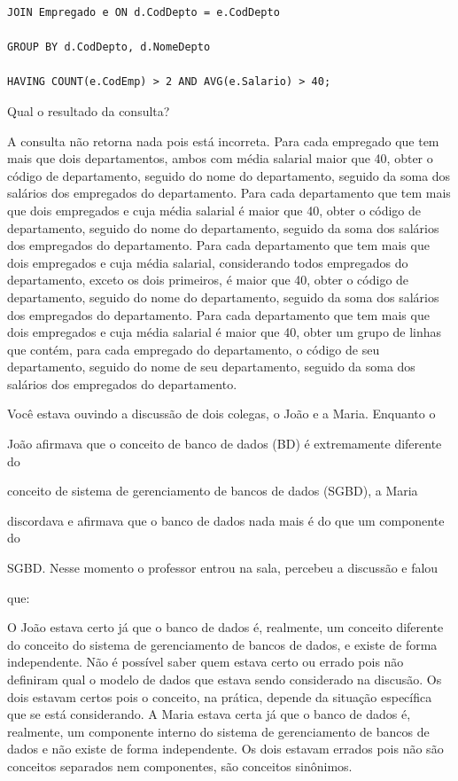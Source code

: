 \documentclass[12pt, addpoints]{exam}
\begin{document}
\begin{questions}
\begin{verbatim}
JOIN Empregado e ON d.CodDepto = e.CodDepto

GROUP BY d.CodDepto, d.NomeDepto

HAVING COUNT(e.CodEmp) > 2 AND AVG(e.Salario) > 40;

\end{verbatim}



Qual o resultado da consulta?
\begin{choices}
\choice A consulta não retorna nada pois está incorreta.
\choice Para cada empregado que tem mais que dois departamentos, ambos com média salarial maior que 40, obter o código de departamento, seguido do nome do departamento, seguido da soma dos salários dos empregados do departamento.
\choice Para cada departamento que tem mais que dois empregados e cuja média salarial é maior que 40, obter o código de departamento, seguido do nome do departamento, seguido da soma dos salários dos empregados do departamento.
\choice Para cada departamento que tem mais que dois empregados e cuja média salarial, considerando todos empregados do departamento, exceto os dois primeiros, é maior que 40, obter o código de departamento, seguido do nome do departamento, seguido da soma dos salários dos empregados do departamento.
\choice Para cada departamento que tem mais que dois empregados e cuja média salarial é maior que 40, obter um grupo de linhas que contém, para cada empregado do departamento, o código de seu departamento, seguido do nome de seu departamento, seguido da soma dos salários dos empregados do departamento.
\end{choices}

\question

Você estava ouvindo a discussão de dois colegas, o João e a Maria. Enquanto o

João afirmava que o conceito de banco de dados (BD) é extremamente diferente do

conceito de sistema de gerenciamento de bancos de dados (SGBD), a Maria

discordava e afirmava que o banco de dados nada mais é do que um componente do

SGBD. Nesse momento o professor entrou na sala, percebeu a discussão e falou

que:
\begin{choices}
\choice O João estava certo já que o banco de dados é, realmente, um conceito diferente do conceito do sistema de gerenciamento de bancos de dados, e existe de forma independente.
\choice Não é possível saber quem estava certo ou errado pois não definiram qual o modelo de dados que estava sendo considerado na discusão.
\choice Os dois estavam certos pois o conceito, na prática, depende da situação específica que se está considerando.
\choice A Maria estava certa já que o banco de dados é, realmente, um componente interno do sistema de gerenciamento de bancos de dados e não existe de forma independente.
\choice Os dois estavam errados pois não são conceitos separados nem componentes, são conceitos sinônimos.
\end{choices}


\end{questions}
\end{document}
